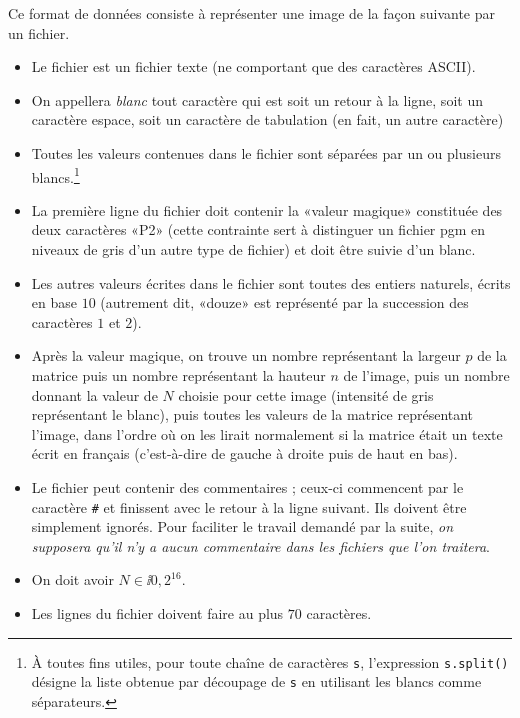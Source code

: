 Ce format de données consiste à représenter une image de la façon
suivante par un fichier.
\begin{itemize}
\item[\textbullet] Le fichier est un fichier texte (ne comportant que des
  caractères ASCII).
\item[\textbullet] On appellera \emph{blanc} tout caractère qui est soit un retour à la
  ligne, soit un caractère espace, soit un caractère de tabulation (en
  fait, un autre caractère)
\item[\textbullet] Toutes les valeurs contenues dans le fichier sont séparées par
  un ou plusieurs blancs.\footnote{À toutes fins utiles, pour toute
    chaîne de caractères \texttt{s}, l'expression \texttt{s.split()} désigne
    la liste obtenue par découpage de \texttt{s} en utilisant les blancs
    comme séparateurs.}
\item[\textbullet] La première ligne du fichier doit contenir la «valeur magique»
  constituée des deux caractères «P2» (cette contrainte sert à
  distinguer un fichier pgm en niveaux de gris d'un autre type de fichier) et doit être
  suivie d'un blanc.
\item[\textbullet] Les autres valeurs écrites dans le fichier sont toutes des
  entiers naturels, écrits en base $10$ (autrement
  dit, «douze» est représenté par la succession des caractères $1$ et $2$).
\item[\textbullet] Après  la valeur  magique, on trouve  un nombre  représentant la
  largeur $p$ de la matrice puis un nombre représentant la hauteur $n$
  de l'image,  puis un  nombre donnant la  valeur de $N$  choisie pour
  cette image  (intensité de gris représentant le  blanc), puis toutes
  les valeurs de  la matrice représentant l'image, dans  l'ordre où on
  les  lirait  normalement si  la  matrice  était  un texte  écrit  en
  français (c'est-à-dire de gauche à droite puis de haut en bas).
\item[\textbullet] Le fichier peut contenir des commentaires ; ceux-ci commencent par le
  caractère \texttt{\#} et finissent avec le retour à la ligne
  suivant. Ils doivent être simplement ignorés. Pour faciliter le
  travail demandé par la suite, \emph{on supposera qu'il n'y a aucun
    commentaire dans les fichiers que l'on
  traitera}.
\item[\textbullet] On doit avoir $N\in\ii{0, 2^{16}}$.
\item[\textbullet] Les lignes du fichier doivent faire au plus $70$ caractères.
\end{itemize}

